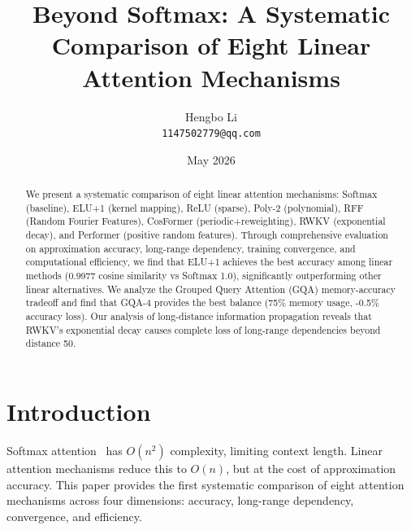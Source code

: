 \documentclass{article}
\title{Beyond Softmax: A Systematic Comparison of Eight Linear Attention Mechanisms}
\author{Hengbo Li\\
\texttt{1147502779@qq.com}
}
\date{May 2026}
\begin{document}
\maketitle

\begin{abstract}
We present a systematic comparison of eight linear attention mechanisms: Softmax (baseline), ELU+1 (kernel mapping), ReLU (sparse), Poly-2 (polynomial), RFF (Random Fourier Features), CosFormer (periodic+reweighting), RWKV (exponential decay), and Performer (positive random features). Through comprehensive evaluation on approximation accuracy, long-range dependency, training convergence, and computational efficiency, we find that ELU+1 achieves the best accuracy among linear methods (0.9977 cosine similarity vs Softmax 1.0), significantly outperforming other linear alternatives. We analyze the Grouped Query Attention (GQA) memory-accuracy tradeoff and find that GQA-4 provides the best balance (75\% memory usage, -0.5\% accuracy loss). Our analysis of long-distance information propagation reveals that RWKV's exponential decay causes complete loss of long-range dependencies beyond distance 50.
\end{abstract}

\section{Introduction}

Softmax attention~\cite{vaswani2017attention} has $O(n^2)$ complexity, limiting context length. Linear attention mechanisms reduce this to $O(n)$, but at the cost of approximation accuracy. This paper provides the first systematic comparison of eight attention mechanisms across four dimensions: accuracy, long-range dependency, convergence, and efficiency.
\end{document}
